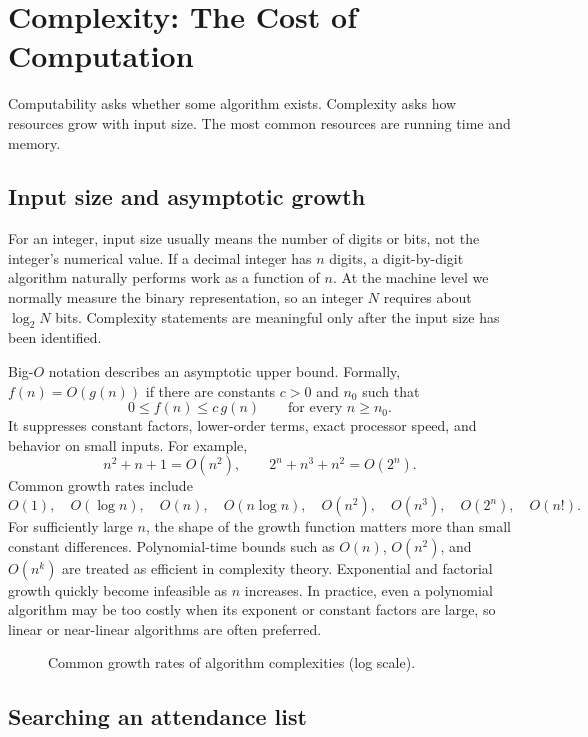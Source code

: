\documentclass[11pt]{article}
\begin{document}
\section{Complexity: The Cost of Computation}

Computability asks whether some algorithm exists. Complexity asks how resources grow with input size. The most common resources are running time and memory.

\subsection{Input size and asymptotic growth}

For an integer, input size usually means the number of digits or bits, not the
integer's numerical value. If a decimal integer has $n$ digits, a digit-by-digit
algorithm naturally performs work as a function of $n$. At the machine level we
normally measure the binary representation, so an integer $N$ requires about
$\log_2 N$ bits. Complexity statements are meaningful only after the input size
has been identified.

Big-$O$ notation describes an asymptotic upper bound. Formally, $f(n)=O(g(n))$
if there are constants $c>0$ and $n_0$ such that
\[
  0\le f(n)\le c\,g(n) \qquad\text{for every }n\ge n_0.
\]
It suppresses constant factors, lower-order terms, exact processor speed, and
behavior on small inputs. For example,
\[
  n^2+n+1=O(n^2),
  \qquad
  2^n+n^3+n^2=O(2^n).
\]
Common growth rates include
\[
  O(1),\quad O(\log n),\quad O(n),\quad O(n\log n),\quad
 O(n^2),\quad O(n^3),\quad O(2^n),\quad O(n!).
\]
For sufficiently large $n$, the shape of the growth function matters more than
small constant differences. Polynomial-time bounds such as $O(n)$, $O(n^2)$,
and $O(n^k)$ are treated as efficient in complexity theory. Exponential and
factorial growth quickly become infeasible as $n$ increases. In practice, even
a polynomial algorithm may be too costly when its exponent or constant factors
are large, so linear or near-linear algorithms are often preferred.

\begin{figure}[htbp]
  \centering
  
  \caption{Common growth rates of algorithm complexities (log scale).}
\end{figure}

\subsection{Searching an attendance list}
\end{document}
